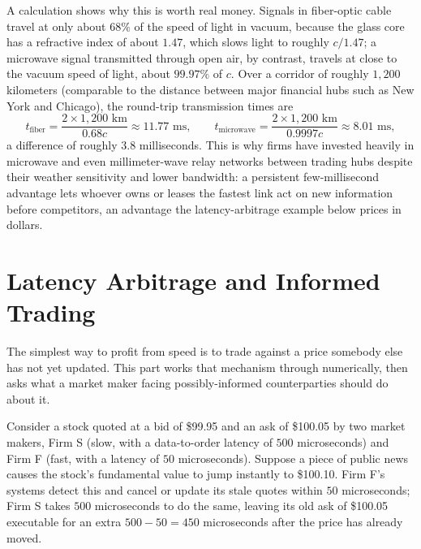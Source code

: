 \documentclass[../ai_in_finance]{subfiles}
\begin{document}
A calculation shows why this is worth real money. Signals in fiber-optic cable travel at only about $68\%$ of the speed of light in vacuum, because the glass core has a refractive index of about $1.47$, which slows light to roughly $c/1.47$; a microwave signal transmitted through open air, by contrast, travels at close to the vacuum speed of light, about $99.97\%$ of $c$. Over a corridor of roughly $1{,}200$ kilometers (comparable to the distance between major financial hubs such as New York and Chicago), the round-trip transmission times are
\begin{equation*}
t_{\text{fiber}} = \frac{2 \times 1{,}200 \text{ km}}{0.68c} \approx 11.77 \text{ ms}, \qquad t_{\text{microwave}} = \frac{2 \times 1{,}200 \text{ km}}{0.9997c} \approx 8.01 \text{ ms},
\end{equation*}
a difference of roughly $3.8$ milliseconds. This is why firms have invested heavily in microwave and even millimeter-wave relay networks between trading hubs despite their weather sensitivity and lower bandwidth: a persistent few-millisecond advantage lets whoever owns or leases the fastest link act on new information before competitors, an advantage the latency-arbitrage example below prices in dollars.

\section{Latency Arbitrage and Informed Trading}

The simplest way to profit from speed is to trade against a price somebody else has not yet updated. This part works that mechanism through numerically, then asks what a market maker facing possibly-informed counterparties should do about it.

\label{sec:latency-arb}

Consider a stock quoted at a bid of \$99.95 and an ask of \$100.05 by two market makers, Firm S (slow, with a data-to-order latency of $500$ microseconds) and Firm F (fast, with a latency of $50$ microseconds). Suppose a piece of public news causes the stock's fundamental value to jump instantly to \$100.10. Firm F's systems detect this and cancel or update its stale quotes within $50$ microseconds; Firm S takes $500$ microseconds to do the same, leaving its old ask of \$100.05 executable for an extra $500-50=450$ microseconds after the price has already moved.
\end{document}
